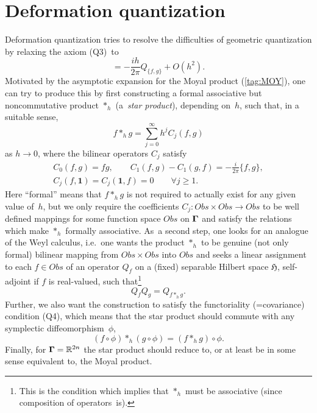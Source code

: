 \documentclass[12pt]{amsart}
\numberwithin{equation}{section}
\theoremstyle{remark}
\let\boldkey\mathbf \let\bold\mathbf
\newcommand\jedna{{\boldkey1}}
\newcommand\Obs{Obs}
\newcommand\Omg{{\bigam}}   %
\newcommand\HH{\mathfrak H}
\newcommand\RR{\mathbb R}
\newcommand{\bigam}{\mbox{\boldmath $\Gamma$}}
\begin{document}
\section{Deformation quantization} \label{sec3}
Deformation quantization tries to resolve the difficulties of geometric
quantization by relaxing the axiom (Q3)~to
\begin{equation}  [Q_f,Q_g] = -\frac{ih}{2\pi} Q_{\{f,g\}} + O(h^2).
\label{tag:Da}  \end{equation}
Motivated by the asymptotic expansion for the Moyal product (\ref{tag:MOY}),
one can try to produce this by first constructing a formal associative but
noncommutative product $*_h$ (a~{\it star product\/}), depending on~$h$, such
that, in a suitable sense,
\begin{equation}  f *_h g = \sum_{j=0}^\infty  h^j C_j(f,g)  \label{tag:Db}
\end{equation}
as $h\to0$, where the bilinear operators $C_j$ satisfy
\begin{gather}
C_0(f,g)=fg, \qquad C_1(f,g)-C_1(g,f)=-\tfrac i{2\pi}\{f,g\},  \label{tag:Dc}
\\ C_j(f,\jedna)=C_j(\jedna,f)=0 \qquad \forall j\ge1.  \label{tag:Dca}
\end{gather}
Here ``formal'' means that $f*_h g$ is not required to actually exist for any
given value of~$h$, but we only require the coefficients $C_j:\Obs\times\Obs\to
\Obs$ to be well defined mappings for some function space $\Obs$ on $\Omg$ and
satisfy the relations which make $*_h$ formally associative. As~a second step,
one looks for an analogue of the Weyl calculus, i.e.~one wants the product
$*_h$ to be genuine (not only formal) bilinear mapping from $\Obs\times\Obs$
into $\Obs$ and seeks a linear assignment to each $f\in\Obs$ of an operator
$Q_f$ on a (fixed) separable Hilbert space $\HH$, self-adjoint if $f$ is
real-valued, such that\footnote{This is the condition which implies that $*_h$
must be associative (since composition of operators~is).}
\begin{equation}  Q_f Q_g = Q_{f*_h g}.  \label{tag:Dd}  \end{equation}
Further, we also want the construction to satisfy the functoriality
(=covariance) condition (Q4), which means that the star product should commute
with any symplectic diffeomorphism~$\phi$,
\begin{equation}  (f\circ\phi) *_h (g\circ\phi) = (f*_h g)\circ\phi.
\label{tag:Dda}  \end{equation}
Finally, for $\Omg=\RR^{2n}$ the star product should reduce to, or at least be
in some sense equivalent to, the Moyal product.
\end{document}
